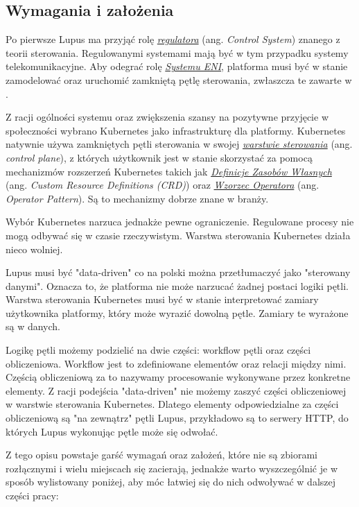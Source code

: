 \subsection{Wymagania i założenia}

Po pierwsze Lupus ma przyjąć rolę \hyperlink{def:regulator}{\textit{regulatora}} (ang. \textit{Control System}) znanego z teorii sterowania. Regulowanymi systemami mają być w tym przypadku systemy telekomunikacyjne. Aby odegrać rolę \hyperlink{def:system-eni}{\textit{Systemu ENI}}, platforma musi być w stanie zamodelować oraz uruchomić  zamkniętą pętlę sterowania, zwłaszcza te zawarte w \cite{enioverview}. 

Z racji ogólności systemu oraz zwiększenia szansy na pozytywne przyjęcie w społeczności wybrano Kubernetes jako infrastrukturę dla platformy. Kubernetes natywnie używa zamkniętych pętli sterowania w swojej \hyperlink{def:warstwa-sterowania}{\textit{warstwie sterowania}} (ang. \textit{control plane}), z których użytkownik jest w stanie skorzystać za pomocą mechanizmów rozszerzeń Kubernetes takich jak \hyperlink{def:crd}{\textit{Definicje Zasobów Własnych}} (ang. \textit{Custom Resource Definitions (CRD)}) oraz \hyperlink{def:wzorzec-operator}{\textit{Wzorzec Operatora}} (ang. \textit{Operator Pattern}). Są to mechanizmy dobrze znane w branży. 


Wybór Kubernetes narzuca jednakże pewne ograniczenie. Regulowane procesy nie mogą odbywać się w czasie rzeczywistym. Warstwa sterowania Kubernetes działa nieco wolniej. 

Lupus musi być "data-driven" co na polski można przetłumaczyć jako "sterowany danymi". Oznacza to, że platforma nie może narzucać żadnej postaci logiki pętli. Warstwa sterowania Kubernetes musi być w stanie interpretować zamiary użytkownika platformy, który może wyrazić dowolną pętle. Zamiary te wyrażone są w danych. 

Logikę pętli możemy podzielić na dwie części: workflow pętli oraz części obliczeniowa. Workflow jest to zdefiniowane elementów oraz relacji między nimi. Częścią obliczeniową za to nazywamy procesowanie wykonywane przez konkretne elementy. Z racji podejścia "data-driven" nie możemy zaszyć części obliczeniowej w warstwie sterowania Kubernetes. Dlatego elementy odpowiedzialne za części obliczeniową są "na zewnątrz" pętli Lupus, przykładowo są to serwery HTTP, do których Lupus wykonując pętle może się odwołać.

Z tego opisu powstaje garść wymagań oraz założeń, które nie są zbiorami rozłącznymi i wielu miejscach się zacierają, jednakże warto wyszczególnić je w sposób wylistowany poniżej, aby móc łatwiej się do nich odwoływać w dalszej części pracy:

